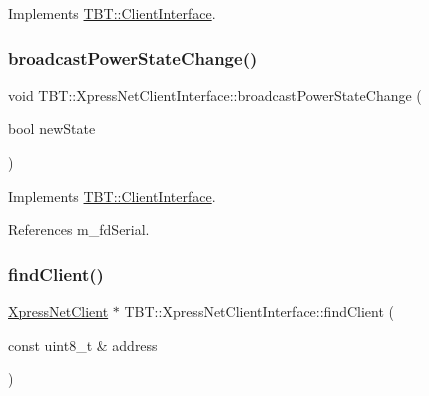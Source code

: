 Implements \hyperlink{classTBT_1_1ClientInterface_aaede3709fa0dcb23743f43d9c1a5ab04_aaede3709fa0dcb23743f43d9c1a5ab04}{T\+B\+T\+::\+Client\+Interface}.

\mbox{\label{classTBT_1_1XpressNetClientInterface_a338da1925ec68f197e87625c7497f472_a338da1925ec68f197e87625c7497f472}} 
\subsubsection{\texorpdfstring{broadcast\+Power\+State\+Change()}{broadcastPowerStateChange()}}
{\footnotesize\ttfamily void T\+B\+T\+::\+Xpress\+Net\+Client\+Interface\+::broadcast\+Power\+State\+Change (\begin{DoxyParamCaption}\item[{bool}]{new\+State }\end{DoxyParamCaption})\hspace{0.3cm}{\ttfamily [virtual]}}



Implements \hyperlink{classTBT_1_1ClientInterface_a7888a3446fb416fad75e5e008a85ca0c_a7888a3446fb416fad75e5e008a85ca0c}{T\+B\+T\+::\+Client\+Interface}.



References m\+\_\+fd\+Serial.

\mbox{\label{classTBT_1_1XpressNetClientInterface_ac7c05010e7a1cb8fe251c0154ca421d3_ac7c05010e7a1cb8fe251c0154ca421d3}} 
\subsubsection{\texorpdfstring{find\+Client()}{findClient()}}
{\footnotesize\ttfamily \hyperlink{classTBT_1_1XpressNetClient}{Xpress\+Net\+Client} $\ast$ T\+B\+T\+::\+Xpress\+Net\+Client\+Interface\+::find\+Client (\begin{DoxyParamCaption}\item[{const uint8\+\_\+t \&}]{address }\end{DoxyParamCaption})\hspace{0.3cm}{\ttfamily [protected]}}



